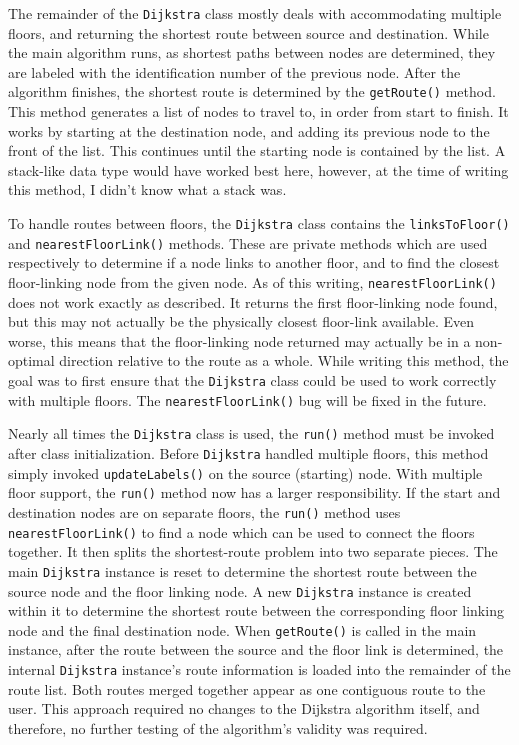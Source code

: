 \documentclass[12pt,letterpaper,titlepage]{article}   %
\begin{document}
The remainder of the \texttt{Dijkstra} class mostly deals with accommodating
multiple floors, and returning the shortest route between source and
destination. While the main algorithm runs, as shortest paths between
nodes are determined, they are labeled with the identification number of
the previous node. After the algorithm finishes, the shortest route is
determined by the \texttt{getRoute()} method. This method generates a list of
nodes to travel to, in order from start to finish. It works by starting
at the destination node, and adding its previous node to the front of
the list. This continues until the starting node is contained by the
list. A stack-like data type would have worked best here, however, at
the time of writing this method, I didn't know what a stack was.

To handle routes between floors, the \texttt{Dijkstra} class contains the
\texttt{linksToFloor()} and \texttt{nearestFloorLink()} methods. These
are private methods
which are used respectively to determine if a node links to another
floor, and to find the closest floor-linking node from the given node.
As of this writing, \texttt{nearestFloorLink()} does not work exactly as
described. It returns the first floor-linking node found, but this may
not actually be the physically closest floor-link available. Even worse,
this means that the floor-linking node returned may actually be in a
non-optimal direction relative to the route as a whole. While writing
this method, the goal was to first ensure that the \texttt{Dijkstra} class could
be used to work correctly with multiple floors. The \texttt{nearestFloorLink()}
bug will be fixed in the future.

Nearly all times the \texttt{Dijkstra} class is used, the
\texttt{run()} method must be invoked after class initialization.
Before \texttt{Dijkstra} handled multiple
floors, this method simply invoked \texttt{updateLabels()} on the source
(starting) node. With multiple floor support, the \texttt{run()} method
now has a
larger responsibility. If the start and destination nodes are on
separate floors, the \texttt{run()} method uses
\texttt{nearestFloorLink()} to find a node
which can be used to connect the floors together. It then splits the
shortest-route problem into two separate pieces. The main \texttt{Dijkstra}
instance is reset to determine the shortest route between the source
node and the floor linking node. A new \texttt{Dijkstra} instance is created
within it to determine the shortest route between the corresponding
floor linking node and the final destination node. When \texttt{getRoute()} is
called in the main instance, after the route between the source and the
floor link is determined, the internal \texttt{Dijkstra} instance's route
information is loaded into the remainder of the route list. Both routes
merged together appear as one contiguous route to the user. This
approach required no changes to the Dijkstra algorithm itself, and
therefore, no further testing of the algorithm's validity was required.
\end{document}
